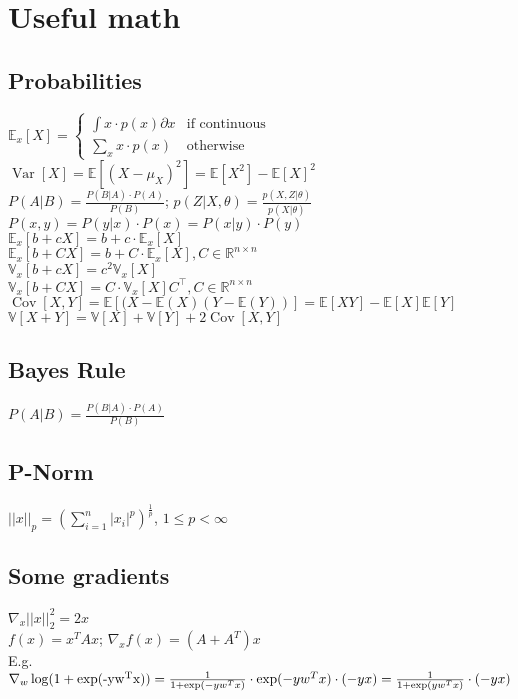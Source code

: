 \section*{Useful math}

\subsection*{Probabilities}
$\mathbb{E}_x[X] = \begin{cases}
   \int x \cdot p(x) \partial x  & \text{if continuous}\\
   \sum_x x \cdot p(x) & \text{otherwise}
  \end{cases}$\\
$\operatorname{Var}[X] = \mathbb{E}[(X-\mu_X)^2] = \mathbb{E}[X^2] - \mathbb{E}[X]^2$\\
$P(A|B) = \frac{P(B|A) \cdot P(A)}{P(B)}$; $p(Z|X,\theta) = \frac{p(X,Z|\theta)}{p(X|\theta)}$\\
$P(x,y) = P(y|x) \cdot  P(x) = P(x|y) \cdot P(y)$ \\
$\mathbb{E}_x[b+ cX] = b+c\cdot \mathbb{E}_x[X]$ \\
$\mathbb{E}_x[b+ CX] = b+C\cdot\mathbb{E}_x[X], C \in \mathbb{R}^{n\times n}$ \\
$\mathbb{V}_x[b+cX] = c^2\mathbb{V}_x[X]$\\
$\mathbb{V}_x[b+ CX] = C\cdot\mathbb{V}_x[X]C^\top, C \in \mathbb{R}^{n\times n}$\\
$\operatorname{Cov}[X,Y] = \mathbb{E}[(X-\mathbb{E}(X)(Y-\mathbb{E}(Y))] =\mathbb{E}[XY]-\mathbb{E}[X]\mathbb{E}[Y]$ \\
$\mathbb{V}[X+Y] = \mathbb{V}[X]+\mathbb{V}[Y]+2\operatorname{Cov}[X,Y]$
\subsection*{Bayes Rule}
$P(A|B) = \frac{P(B|A) \cdot P(A)}{P(B)}$

\subsection*{P-Norm}
$||x||_p = (\sum_{i=1}^n|x_i|^p)^{\frac{1}{p}}$, $1 \leq p < \infty$

\subsection*{Some gradients}
$\nabla_x ||x||_2^2 = 2 x$\\
$f(x) = x^T A x$; $\nabla_x f(x) = (A + A^T) x$\\
E.g. $\nabla_w \operatorname{log}(1+\operatorname{exp(-y w^T x)}) = \\
\frac{1}{1+\operatorname{exp}(-y w^T x)} \cdot \operatorname{exp}(-y w^T x) \cdot (-y x) = \\
\frac{1}{1 + \operatorname{exp}(y w^T x)} \cdot(-yx)$

